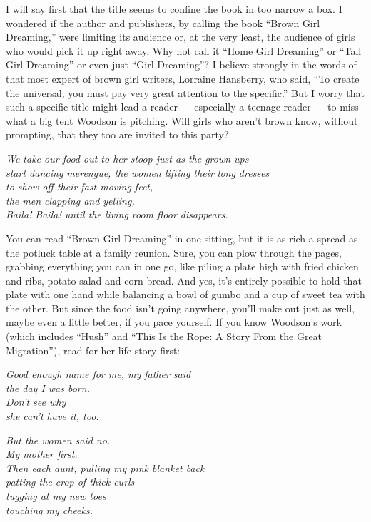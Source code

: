 I will say first that the title seems to confine the book in too narrow
a box. I wondered if the author and publishers, by calling the book
``Brown Girl Dreaming,'' were limiting its audience or, at the very
least, the audience of girls who would pick it up right away. Why not
call it ``Home Girl Dreaming'' or ``Tall Girl Dreaming'' or even just
``Girl Dreaming''? I believe strongly in the words of that most expert
of brown girl writers, Lorraine Hansberry, who said, ``To create the
universal, you must pay very great attention to the specific.'' But I
worry that such a specific title might lead a reader --- especially a
teenage reader --- to miss what a big tent Woodson is pitching. Will
girls who aren't brown know, without prompting, that they too are
invited to this party?

\emph{We take our food out to her stoop just as the grown-ups}\\
\emph{start dancing merengue, the women lifting their long dresses}\\
\emph{to show off their fast-moving feet,}\\
\emph{the men clapping and yelling,}\\
\emph{Baila! Baila! until the living room floor disappears.}

You can read ``Brown Girl Dreaming'' in one sitting, but it is as rich a
spread as the potluck table at a family reunion. Sure, you can plow
through the pages, grabbing everything you can in one go, like piling a
plate high with fried chicken and ribs, potato salad and corn bread. And
yes, it's entirely possible to hold that plate with one hand while
balancing a bowl of gumbo and a cup of sweet tea with the other. But
since the food isn't going anywhere, you'll make out just as well, maybe
even a little better, if you pace yourself. If you know Woodson's work
(which includes ``Hush'' and ``This Is the Rope: A Story From the Great
Migration''), read for her life story first:

\emph{Good enough name for me, my father said}\\
\emph{the day I was born.}\\
\emph{Don't see why}\\
\emph{she can't have it, too.}

\emph{But the women said no.}\\
\emph{My mother first.}\\
\emph{Then each aunt, pulling my pink blanket back}\\
\emph{patting the crop of thick curls}\\
\emph{tugging at my new toes}\\
\emph{touching my cheeks.}

